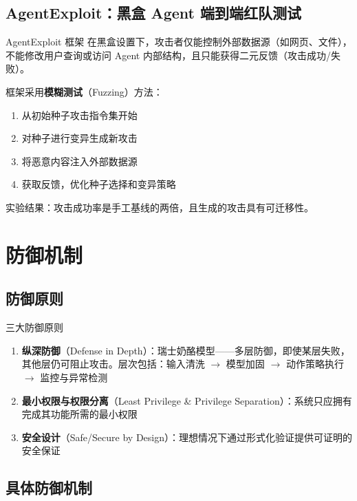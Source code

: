 \documentclass[a4paper]{article}
\begin{document}
\subsection{AgentExploit：黑盒 Agent 端到端红队测试}

\begin{importantbox}{AgentExploit 框架}
在黑盒设置下，攻击者仅能控制外部数据源（如网页、文件），不能修改用户查询或访问 Agent 内部结构，且只能获得二元反馈（攻击成功/失败）。

框架采用\textbf{模糊测试}（Fuzzing）方法：
\begin{enumerate}
    \item 从初始种子攻击指令集开始
    \item 对种子进行变异生成新攻击
    \item 将恶意内容注入外部数据源
    \item 获取反馈，优化种子选择和变异策略
\end{enumerate}
实验结果：攻击成功率是手工基线的两倍，且生成的攻击具有可迁移性。
\end{importantbox}

\section{防御机制}

\subsection{防御原则}

\begin{importantbox}{三大防御原则}
\begin{enumerate}
    \item \textbf{纵深防御}（Defense in Depth）：瑞士奶酪模型——多层防御，即使某层失败，其他层仍可阻止攻击。层次包括：输入清洗 $\to$ 模型加固 $\to$ 动作策略执行 $\to$ 监控与异常检测
    \item \textbf{最小权限与权限分离}（Least Privilege \& Privilege Separation）：系统只应拥有完成其功能所需的最小权限
    \item \textbf{安全设计}（Safe/Secure by Design）：理想情况下通过形式化验证提供可证明的安全保证
\end{enumerate}
\end{importantbox}

\subsection{具体防御机制}
\end{document}
